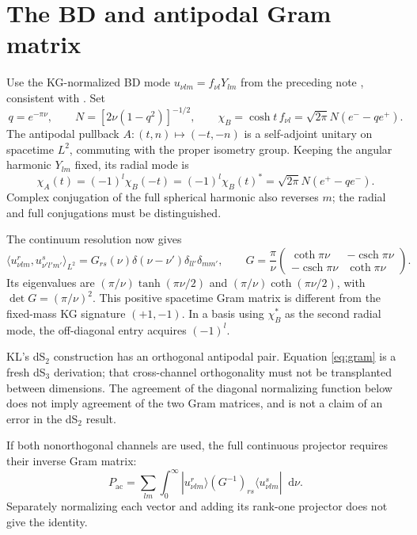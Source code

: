 \documentclass[11pt,a4paper]{article}
\newcommand{\dd}{\mathop{}\!\mathrm d}
\newcommand{\csch}{\operatorname{csch}}
\begin{document}
\section{The BD and antipodal Gram matrix}
Use the KG-normalized BD mode $u_{\nu lm}=f_{\nu l}Y_{lm}$ from the
preceding note \cite{local}, consistent with \cite{MM}. Set
\[
 q=e^{-\pi\nu},\qquad N=[2\nu(1-q^2)]^{-1/2},\qquad
 \chi_B=\cosh t\,f_{\nu l}=\sqrt{2\pi}N(e^- -qe^+).
\]
The antipodal pullback $A:(t,n)\mapsto(-t,-n)$ is a self-adjoint
unitary on spacetime $L^2$, commuting with the proper isometry group.
Keeping the angular harmonic $Y_{lm}$ fixed, its radial mode is
\begin{equation}
 \chi_A(t)=(-1)^l\chi_B(-t)=(-1)^l\chi_B(t)^*
             =\sqrt{2\pi}N(e^+ -qe^-).
\end{equation}
Complex conjugation of the full spherical harmonic also reverses $m$;
the radial and full conjugations must be distinguished.

The continuum resolution now gives
\begin{equation}
 \langle u_{\nu lm}^{r},u_{\nu'l'm'}^{s}\rangle_{L^2}
 =G_{rs}(\nu)\delta(\nu-\nu')\delta_{ll'}\delta_{mm'},\qquad
 G=\frac{\pi}{\nu}
 \begin{pmatrix}\coth\pi\nu&-\csch\pi\nu\\
                 -\csch\pi\nu&\coth\pi\nu\end{pmatrix}.
 \label{eq:gram}
\end{equation}
Its eigenvalues are $(\pi/\nu)\tanh(\pi\nu/2)$ and
$(\pi/\nu)\coth(\pi\nu/2)$, with $\det G=(\pi/\nu)^2$.
This positive spacetime Gram matrix is different from the fixed-mass
KG signature $(+1,-1)$. In a basis using $\chi_B^*$ as the second radial
mode, the off-diagonal entry acquires $(-1)^l$.

KL's dS$_2$ construction \cite[eqs.\ (4.9)--(4.11)]{KL} has an
orthogonal antipodal pair. Equation \eqref{eq:gram} is a fresh
dS$_3$ derivation; that cross-channel orthogonality must not be
transplanted between dimensions. The agreement of the diagonal
normalizing function below does not imply agreement of the two Gram
matrices, and is not a claim of an error in the dS$_2$ result.

If both nonorthogonal channels are used, the full continuous projector
requires their inverse Gram matrix:
\[
 P_{\mathrm{ac}}=\sum_{lm}\int_0^\infty
 |u^r_{\nu lm}\rangle (G^{-1})_{rs}
 \langle u^s_{\nu lm}|\dd\nu .
\]
Separately normalizing each vector and adding its rank-one projector
does not give the identity.
\end{document}
